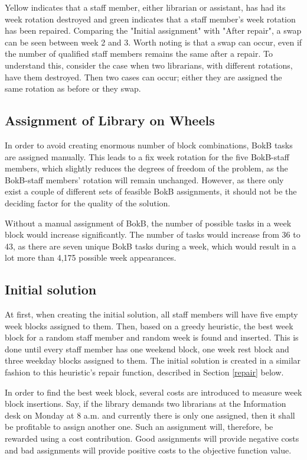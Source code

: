 Yellow indicates that a staff member, either librarian or assistant, has had its week rotation destroyed and green indicates that a staff member's week rotation has been repaired. Comparing the "Initial assignment" with "After repair", a swap can be seen between week 2 and 3. Worth noting is that a swap can occur, even if the number of qualified staff members remains the same after a repair. To understand this, consider the case when two librarians, with different rotations, have them destroyed. Then two cases can occur; either they are assigned the same rotation as before or they swap.


\subsection{Assignment of Library on Wheels} \label{BokB_assignment}
In order to avoid creating enormous number of block combinations, BokB tasks are assigned manually. This leads to a fix week rotation for the five BokB-staff members, which slightly reduces the degrees of freedom of the problem, as the BokB-staff members' rotation will remain unchanged. However, as there only exist a couple of different sets of feasible BokB assignments, it should not be the deciding factor for the quality of the solution.

Without a manual assignment of BokB, the number of possible tasks in a week block would increase significantly. The number of tasks would increase from 36 to 43, as there are seven unique BokB tasks during a week, which would result in a lot more than 4,175 possible week appearances.

\subsection{Initial solution} \label{initial_solution}
At first, when creating the initial solution, all staff members will have five empty week blocks assigned to them. Then, based on a greedy heuristic, the best week block for a random staff member and random week is found and inserted. This is done until every staff member has one weekend block, one week rest block and three weekday blocks assigned to them. The initial solution is created in a similar fashion to this heuristic's repair function, described in Section \ref{repair} below.

In order to find the best week block, several costs are introduced to measure week block insertions. Say, if the library demands two librarians at the Information desk on Monday at 8 a.m. and currently there is only one assigned, then it shall be profitable to assign another one. Such an assignment will, therefore, be rewarded using a cost contribution. Good assignments will provide negative costs and bad assignments will provide positive costs to the objective function value.

